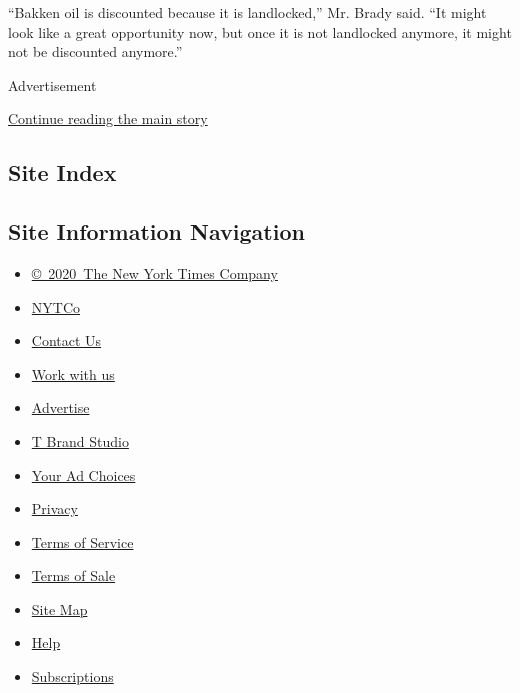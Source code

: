 ``Bakken oil is discounted because it is landlocked,'' Mr. Brady said.
``It might look like a great opportunity now, but once it is not
landlocked anymore, it might not be discounted anymore.''

Advertisement

\protect\hyperlink{after-bottom}{Continue reading the main story}

\hypertarget{site-index}{%
\subsection{Site Index}\label{site-index}}

\hypertarget{site-information-navigation}{%
\subsection{Site Information
Navigation}\label{site-information-navigation}}

\begin{itemize}
\tightlist
\item
  \href{https://help.nytimes3xbfgragh.onion/hc/en-us/articles/115014792127-Copyright-notice}{©~2020~The
  New York Times Company}
\end{itemize}

\begin{itemize}
\tightlist
\item
  \href{https://www.nytco.com/}{NYTCo}
\item
  \href{https://help.nytimes3xbfgragh.onion/hc/en-us/articles/115015385887-Contact-Us}{Contact
  Us}
\item
  \href{https://www.nytco.com/careers/}{Work with us}
\item
  \href{https://nytmediakit.com/}{Advertise}
\item
  \href{http://www.tbrandstudio.com/}{T Brand Studio}
\item
  \href{https://www.nytimes3xbfgragh.onion/privacy/cookie-policy\#how-do-i-manage-trackers}{Your
  Ad Choices}
\item
  \href{https://www.nytimes3xbfgragh.onion/privacy}{Privacy}
\item
  \href{https://help.nytimes3xbfgragh.onion/hc/en-us/articles/115014893428-Terms-of-service}{Terms
  of Service}
\item
  \href{https://help.nytimes3xbfgragh.onion/hc/en-us/articles/115014893968-Terms-of-sale}{Terms
  of Sale}
\item
  \href{https://spiderbites.nytimes3xbfgragh.onion}{Site Map}
\item
  \href{https://help.nytimes3xbfgragh.onion/hc/en-us}{Help}
\item
  \href{https://www.nytimes3xbfgragh.onion/subscription?campaignId=37WXW}{Subscriptions}
\end{itemize}
